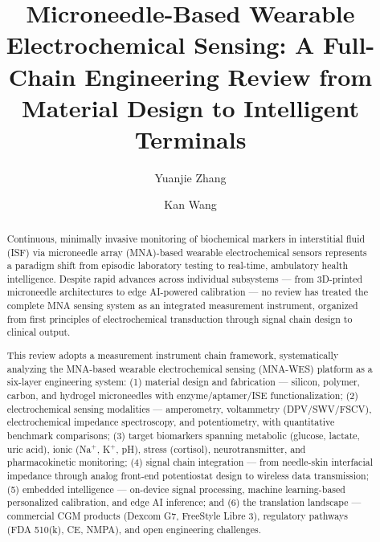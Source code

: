 \documentclass[review,1p]{elsarticle}
\begin{document}
\begin{frontmatter}

\title{Microneedle-Based Wearable Electrochemical Sensing: A Full-Chain Engineering Review from Material Design to Intelligent Terminals}

\author[inst1]{Yuanjie Zhang}
\author[inst1]{Kan Wang}



\begin{abstract}
Continuous, minimally invasive monitoring of biochemical markers in interstitial fluid (ISF) via microneedle array (MNA)-based wearable electrochemical sensors represents a paradigm shift from episodic laboratory testing to real-time, ambulatory health intelligence. Despite rapid advances across individual subsystems — from 3D-printed microneedle architectures to edge AI-powered calibration — no review has treated the complete MNA sensing system as an integrated measurement instrument, organized from first principles of electrochemical transduction through signal chain design to clinical output.

This review adopts a measurement instrument chain framework, systematically analyzing the MNA-based wearable electrochemical sensing (MNA-WES) platform as a six-layer engineering system: (1) material design and fabrication — silicon, polymer, carbon, and hydrogel microneedles with enzyme/aptamer/ISE functionalization; (2) electrochemical sensing modalities — amperometry, voltammetry (DPV/SWV/FSCV), electrochemical impedance spectroscopy, and potentiometry, with quantitative benchmark comparisons; (3) target biomarkers spanning metabolic (glucose, lactate, uric acid), ionic (Na$^+$, K$^+$, pH), stress (cortisol), neurotransmitter, and pharmacokinetic monitoring; (4) signal chain integration — from needle-skin interfacial impedance through analog front-end potentiostat design to wireless data transmission; (5) embedded intelligence — on-device signal processing, machine learning-based personalized calibration, and edge AI inference; and (6) the translation landscape — commercial CGM products (Dexcom G7, FreeStyle Libre 3), regulatory pathways (FDA 510(k), CE, NMPA), and open engineering challenges.


\end{abstract}
\end{frontmatter}
\end{document}
